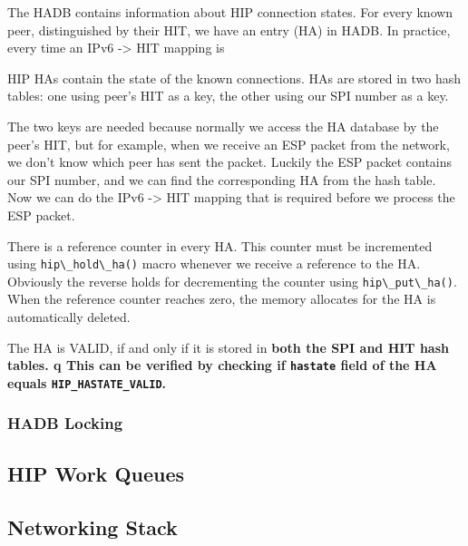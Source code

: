 The HADB contains information about HIP connection states. For every
known peer, distinguished by their HIT, we have an entry (HA) in
HADB. In practice, every time an IPv6 -> HIT mapping is

HIP HAs contain the state of the known connections. HAs are stored in
two hash tables: one using peer's HIT as a key, the other using our
SPI number as a key.

The two keys are needed because normally we access the HA database by
the peer's HIT, but for example, when we receive an ESP packet from
the network, we don't know which peer has sent the packet. Luckily the
ESP packet contains our SPI number, and we can find the corresponding
HA from the hash table. Now we can do the IPv6 -> HIT mapping that is
required before we process the ESP packet.

There is a reference counter in every HA. This counter must be
incremented using \verb|hip\_hold\_ha()| macro whenever we receive a
reference to the HA. Obviously the reverse holds for decrementing the
counter using \verb|hip\_put\_ha()|. When the reference counter reaches
zero, the memory allocates for the HA is automatically deleted.

The HA is VALID, if and only if it is stored in \bf{both} the SPI and
HIT hash tables. q This can be verified by checking if \verb|hastate|
field of the HA equals \verb|HIP_HASTATE_VALID|.

\subsubsection{HADB Locking}


\subsection{HIP Work Queues}
\label{sec:work_queue_architecture}


\subsection{Networking Stack}
\label{sec:networking_stack_architecture}

